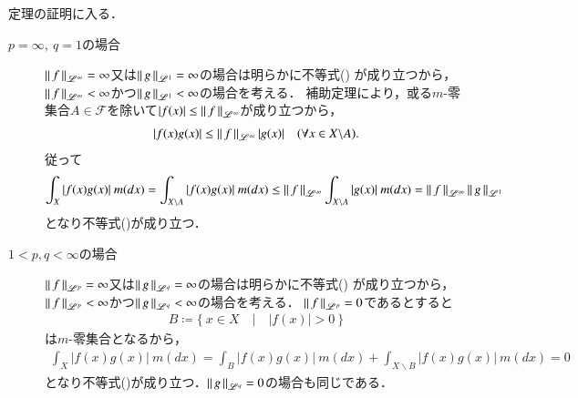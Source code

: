 \begin{qst}
\begin{prf}
	定理の証明に入る．\mbox{}\\
	\begin{description}
		\item[$p = \infty,\ q = 1$の場合]
			$\left\|\, f\, \right\|_{\mathscr{L}^\infty} = \infty$又は$\left\|\, g\, \right\|_{\mathscr{L}^1} = \infty$の場合は明らかに不等式()
			が成り立つから，$\left\|\, f\, \right\|_{\mathscr{L}^\infty} < \infty$かつ$\left\|\, g\, \right\|_{\mathscr{L}^1} < \infty$の場合を考える．
			補助定理により，或る$m$-零集合$A \in \mathcal{F}$を除いて$|f(x)| \leq \left\|\, f\, \right\|_{\mathscr{L}^\infty}$が成り立つから，
			\begin{align}
				|f(x)g(x)| \leq \left\|\, f\, \right\|_{\mathscr{L}^\infty}|g(x)| \quad (\forall x \in X \backslash A).
			\end{align}
			従って
			\begin{align}
				\int_{X} |f(x)g(x)|\ m(dx) = \int_{X \backslash A} |f(x)g(x)|\ m(dx) \leq \left\|\, f\, \right\|_{\mathscr{L}^\infty} \int_{X \backslash A} |g(x)|\ m(dx) 
				= \left\|\, f\, \right\|_{\mathscr{L}^\infty} \left\|\, g\, \right\|_{\mathscr{L}^1}
			\end{align}
			となり不等式()が成り立つ．
		
		\item[$1 < p,q < \infty$の場合]
			$\left\|\, f\, \right\|_{\mathscr{L}^p} = \infty$又は$\left\|\, g\, \right\|_{\mathscr{L}^q} = \infty$の場合は明らかに不等式()
			が成り立つから，$\left\|\, f\, \right\|_{\mathscr{L}^p} < \infty$かつ$\left\|\, g\, \right\|_{\mathscr{L}^q} < \infty$の場合を考える．
			$\left\|\, f\, \right\|_{\mathscr{L}^p} = 0$であるとすると
			\begin{align}
				B \coloneqq \{\ x \in X\quad |\quad |f(x)| > 0\ \}
			\end{align}
			は$m$-零集合となるから，
			\begin{align}
				\int_{X} |f(x)g(x)|\ m(dx) = \int_{B} |f(x)g(x)|\ m(dx) + \int_{X \backslash B} |f(x)g(x)|\ m(dx) = 0
			\end{align}
			となり不等式()が成り立つ．$\left\|\, g\, \right\|_{\mathscr{L}^q} = 0$の場合も同じである．
			

\end{description}
\end{prf}
\end{qst}
